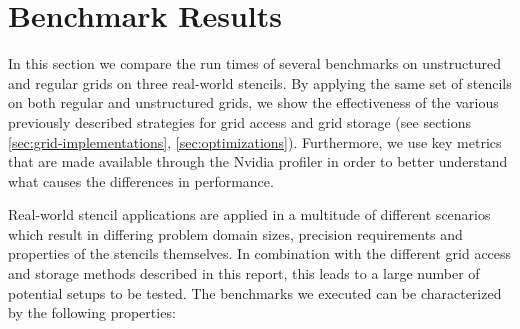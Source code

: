 \chapter{Benchmark Results}	\label{sec:results}

In this section we compare the run times of several benchmarks on unstructured and regular grids on three real-world stencils. By applying the same set of stencils on both regular and unstructured grids, we show the effectiveness of the various previously described strategies for grid access and grid storage (see sections \ref{sec:grid-implementations}, \ref{sec:optimizations}). Furthermore, we use key metrics that are made available through the Nvidia profiler in order to better understand what causes the differences in performance.

Real-world stencil applications are applied in a multitude of different scenarios which result in differing problem domain sizes, precision requirements and properties of the stencils themselves. In combination with the different grid access and storage methods described in this report, this leads to a large number of potential setups to be tested. The benchmarks we executed can be characterized by the following properties:

